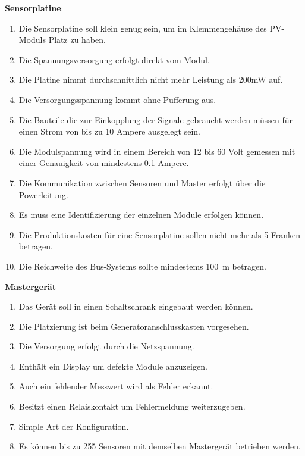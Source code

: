 \textbf{Sensorplatine}:
\begin{enumerate}
    \item
        Die Sensorplatine  soll klein  genug sein, um im  Klemmengeh\"ause des
        PV-Moduls Platz zu haben.
    \item
        Die Spannungsversorgung erfolgt direkt vom Modul.
    \item
        Die Platine nimmt durchschnittlich nicht mehr Leistung als 200mW auf.
    \item
        Die Versorgungsspannung kommt ohne Pufferung aus.
    \item
        Die Bauteile die zur Einkopplung der Signale gebraucht werden m\"ussen
        f\"ur einen Strom von bis zu 10 Ampere ausgelegt sein.
    \item
        Die Modulspannung  wird in einem Bereich  von 12 bis 60  Volt gemessen
        mit einer Genauigkeit von mindestens 0.1 Ampere.
    \item
        Die  Kommunikation zwischen  Sensoren  und Master  erfolgt \"uber  die
        Powerleitung.
    \item
        Es muss eine Identifizierung der einzelnen Module erfolgen k\"onnen.
    \item
        Die Produktionskosten f\"ur eine Sensorplatine sollen nicht mehr als 5
        Franken betragen.
    \item
        Die  Reichweite  des  Bus-Systems sollte  mindestems  \SI{100}{\meter}
        betragen.
\end{enumerate}

\textbf{Masterger\"at}
\begin{enumerate}
    \item
        Das Ger\"at soll in einen Schaltschrank eingebaut werden k\"onnen.
    \item
        Die Platzierung ist beim Generatoranschlusskasten vorgesehen.
    \item
        Die Versorgung erfolgt durch die Netzspannung.
    \item
        Enth\"alt ein Display um defekte Module anzuzeigen.
    \item
        Auch ein fehlender Messwert wird als Fehler erkannt.
    \item
        Besitzt einen Relaiskontakt um Fehlermeldung weiterzugeben.
    \item
        Simple Art der Konfiguration.
    \item
        Es k\"onnen bis zu 255  Sensoren mit demselben Masterger\"at betrieben
        werden.
\end{enumerate}


